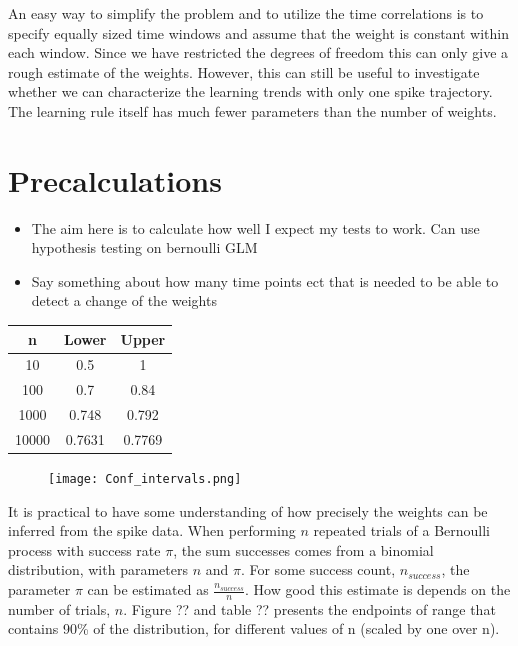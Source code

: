An easy way to simplify the problem and to utilize the time correlations is to specify equally sized time windows and assume that the weight is constant within each window. Since we have restricted the degrees of freedom this can only give a rough estimate of the weights. However, this can still be useful to investigate whether we can characterize the learning trends with only one spike trajectory. The learning rule itself has much fewer parameters than the number of weights. 



\section{Precalculations}
\label{Precalc}

\begin{itemize}
    \item The aim here is to calculate how well I expect my tests to work. Can use hypothesis testing on bernoulli GLM 
    \item Say something about how many time points ect that is needed to be able to detect a change of the weights
\end{itemize}

\begin{table}
\begin{center}
 \begin{tabular}{||c c c ||} 
 \hline
 n & Lower & Upper \\ [0.5ex] 
 \hline\hline
 10 & 0.5 & 1 \\ 
 \hline
 100 & 0.7 & 0.84 \\
 \hline
 1000 & 0.748 & 0.792 \\
 \hline
 10000 & 0.7631 & 0.7769 \\ [1ex] 
 \hline
\end{tabular}
\end{center}
\end{table}

\begin{figure}[h]
    \centering
    \texttt{[image: Conf\_intervals.png]}
\end{figure}

It is practical to have some understanding of how precisely the weights can be inferred from the spike data. When performing $n$ repeated trials of a Bernoulli process with success rate $\pi$, the sum successes comes from a binomial distribution, with parameters $n$ and $\pi$. For some success count, $n_{success}$, the parameter $\pi$ can be estimated as $\frac{n_{success}}{n}$. How good this estimate is depends on the number of trials, $n$. Figure ?? and table ?? presents the endpoints of range that contains 90\% of the distribution, for different values of n (scaled by one over n). 